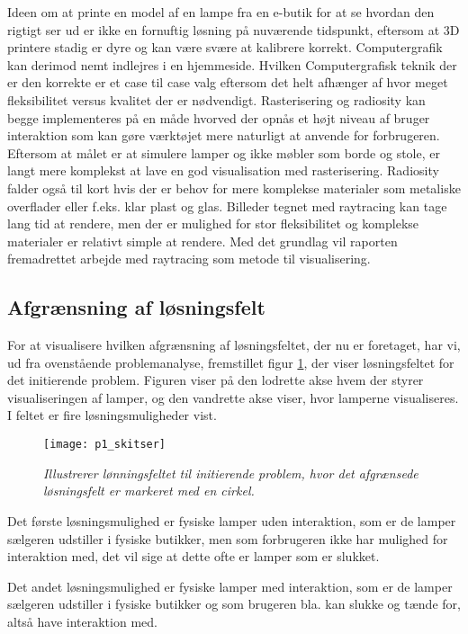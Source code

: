 Ideen om at printe en model af en lampe fra en e-butik for at se hvordan den rigtigt ser ud er ikke en fornuftig løsning på nuværende tidspunkt, eftersom at 3D printere stadig er dyre og kan være svære at kalibrere korrekt. Computergrafik kan derimod nemt indlejres i en hjemmeside. Hvilken Computergrafisk teknik der er den korrekte er et case til case valg eftersom det helt afhænger af hvor meget fleksibilitet versus kvalitet der er nødvendigt. Rasterisering og radiosity kan begge implementeres på en måde hvorved der opnås et højt niveau af bruger interaktion som kan gøre værktøjet mere naturligt at anvende for forbrugeren. Eftersom at målet er at simulere lamper og ikke møbler som borde og stole, er langt mere komplekst at lave en god visualisation med rasterisering. Radiosity falder også til kort hvis der er behov for mere komplekse materialer som metaliske overflader eller f.eks. klar plast og glas. Billeder tegnet med raytracing kan tage lang tid at rendere, men der er mulighed for stor fleksibilitet og komplekse materialer er relativt simple at rendere. Med det grundlag vil raporten fremadrettet arbejde med raytracing som metode til visualisering.

\subsection{Afgrænsning af løsningsfelt}
For at visualisere hvilken afgrænsning af løsningsfeltet, der nu er foretaget, har vi, ud fra ovenstående problemanalyse, fremstillet figur \ref{fig:p1_skitser}, der viser løsningsfeltet for det initierende problem. Figuren viser på den lodrette akse hvem der styrer visualiseringen af lamper, og den vandrette akse viser, hvor lamperne visualiseres. I feltet er fire løsningsmuligheder vist.

\begin{figure}[H]
  
  \centering
  \texttt{[image: p1\_skitser]}
  \caption{\textit{Illustrerer lønningsfeltet til initierende problem, hvor det afgrænsede løsningsfelt er markeret med en cirkel.}}
  \label{fig:p1_skitser}
\end{figure}

Det første løsningsmulighed er fysiske lamper uden interaktion, som er de lamper sælgeren udstiller i fysiske butikker, men som forbrugeren ikke har mulighed for interaktion med, det vil sige at dette ofte er lamper som er slukket.

Det andet løsningsmulighed er fysiske lamper med interaktion, som er de lamper sælgeren udstiller i fysiske butikker og som brugeren bla. kan slukke og tænde for, altså have interaktion med.

